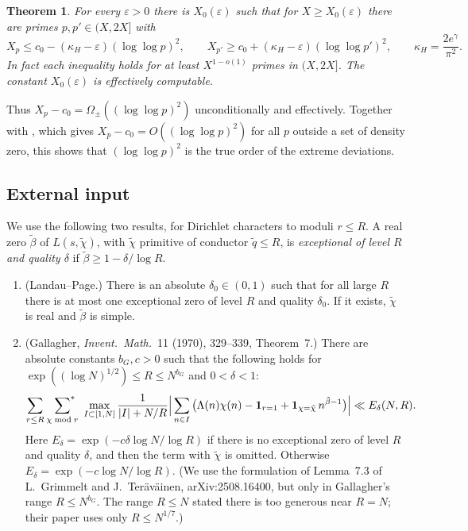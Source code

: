 \documentclass[11pt]{amsart}
\newtheorem{theorem}{Theorem}
\theoremstyle{remark}
\begin{document}
\begin{theorem}\label{thm:H}
For every $\varepsilon>0$ there is $X_0(\varepsilon)$ such that for $X\ge X_0(\varepsilon)$ there are primes $p,p'\in(X,2X]$ with
\[
X_p\le c_0-(\kappa_H-\varepsilon)(\log\log p)^2,\qquad X_{p'}\ge c_0+(\kappa_H-\varepsilon)(\log\log p')^2,\qquad\kappa_H=\frac{2e^\gamma}{\pi^2}.
\]
In fact each inequality holds for at least $X^{1-o(1)}$ primes in $(X,2X]$. The constant $X_0(\varepsilon)$ is effectively computable.
\end{theorem}

Thus $X_p-c_0=\Omega_\pm((\log\log p)^2)$ unconditionally and effectively. Together with \cite[Theorem~E]{TS}, which gives $X_p-c_0=O((\log\log p)^2)$ for all $p$ outside a set of density zero, this shows that $(\log\log p)^2$ is the true order of the extreme deviations.

\subsection{External input}

We use the following two results, for Dirichlet characters to moduli $r\le R$. A real zero $\tilde\beta$ of $L(s,\tilde\chi)$, with $\tilde\chi$ primitive of conductor $\tilde q\le R$, is \emph{exceptional of level $R$ and quality $\delta$} if $\tilde\beta\ge1-\delta/\log R$.

\begin{enumerate}
\item[(LP)] (Landau--Page.) There is an absolute $\delta_0\in(0,1)$ such that for all large $R$ there is at most one exceptional zero of level $R$ and quality $\delta_0$. If it exists, $\tilde\chi$ is real and $\tilde\beta$ is simple.
\item[(Ga)] (Gallagher, \emph{Invent.\ Math.}\ 11 (1970), 329--339, Theorem~7.) There are absolute constants $b_G,c>0$ such that the following holds for $\exp((\log N)^{1/2})\le R\le N^{b_G}$ and $0<\delta<1$:
\[
\sum_{r\le R}\ \sideset{}{^*}\sum_{\chi\bmod r}\ \max_{I\subset[1,N]}\frac1{|I|+N/R}\Big|\sum_{n\in I}\big(\Lambda(n)\chi(n)-\mathbf 1_{r=1}+\mathbf 1_{\chi=\tilde\chi}\,n^{\tilde\beta-1}\big)\Big|\ll E_\delta(N,R).
\]
Here $E_\delta=\exp(-c\delta\log N/\log R)$ if there is no exceptional zero of level $R$ and quality $\delta$, and then the term with $\tilde\chi$ is omitted. Otherwise $E_\delta=\exp(-c\log N/\log R)$. (We use the formulation of Lemma~7.3 of L.~Grimmelt and J.~Ter\"av\"ainen, arXiv:2508.16400, but only in Gallagher's range $R\le N^{b_G}$. The range $R\le N$ stated there is too generous near $R=N$; their paper uses only $R\le N^{1/7}$.)
\end{enumerate}
\end{document}
